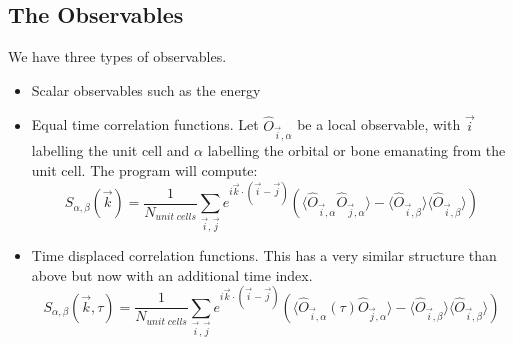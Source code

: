 

\subsection{The Observables}

We have three types of observables. 
\begin{itemize}
\item Scalar observables such as the energy
\item Equal time correlation functions.  Let $\hat{O}_{\vec{i},\alpha} $ be a local observable,  with $\vec{i}$ labelling the unit cell and $\alpha$ labelling the orbital or bone emanating 
from the unit cell.   The program will compute: 
\begin{equation}
	S_{\alpha,\beta}(\vec{k}) = \frac{1}{N_{unit \;  cells}} \sum_{\vec{i},\vec{j}} e^{i \vec{k}\cdot (\vec{i} -  \vec{j} ) } \left( \langle \hat{O}_{\vec{i},\alpha}  \hat{O}_{\vec{j},\alpha} \rangle  - 
	  \langle \hat{O}_{\vec{i},\beta} \rangle \langle   \hat{O}_{\vec{i},\beta}  \rangle \right) 
\end{equation}
\item  Time displaced correlation functions. This has a very similar structure than above but now with an additional time index.
\begin{equation}
	S_{\alpha,\beta}(\vec{k},\tau) = \frac{1}{N_{unit \;  cells}} \sum_{\vec{i},\vec{j}} e^{i \vec{k}\cdot (\vec{i} -  \vec{j} ) } \left( \langle \hat{O}_{\vec{i},\alpha} (\tau) \hat{O}_{\vec{j},\alpha} \rangle  - 
	  \langle \hat{O}_{\vec{i},\beta} \rangle \langle   \hat{O}_{\vec{i},\beta}  \rangle \right) 
\end{equation}
\end{itemize}








